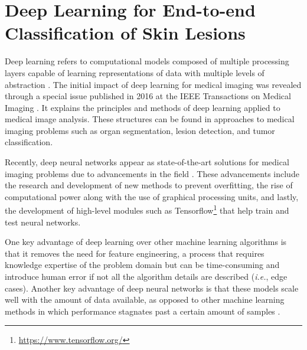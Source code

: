 \section{Deep Learning for End-to-end Classification of Skin Lesions}
\label{section:skin_deep_learning}
    Deep learning refers to computational models composed of multiple processing layers capable of learning representations of data with multiple levels of abstraction \cite{Goodfellow-et-al-2016}. The initial impact of deep learning for medical imaging was revealed through a special issue published in 2016 at the IEEE Transactions on Medical Imaging \cite{Greenspan2016}. It explains the principles and methods of deep learning applied to medical image analysis. These structures can be found in approaches to medical imaging problems such as organ segmentation, lesion detection, and tumor classification. \par
    
    Recently, deep neural networks appear as state-of-the-art solutions for medical imaging problems due to advancements in the field \cite{Litjens2017}. These advancements include the research and development of new methods to prevent overfitting, the rise of computational power along with the use of graphical processing units, and lastly, the development of high-level modules such as Tensorflow\footnote{\url{https://www.tensorflow.org/}} \cite{Abadi} that help train and test neural networks. \par    
    
    One key advantage of deep learning over other machine learning algorithms is that it removes the need for feature engineering, a process that requires knowledge expertise of the problem domain but can be time-consuming and introduce human error if not all the algorithm details are described (\textit{i.e.}, edge cases). Another key advantage of deep neural networks is that these models scale well with the amount of data available, as opposed to other machine learning methods in which performance stagnates past a certain amount of samples \cite{Alom2019}. \par 
    
